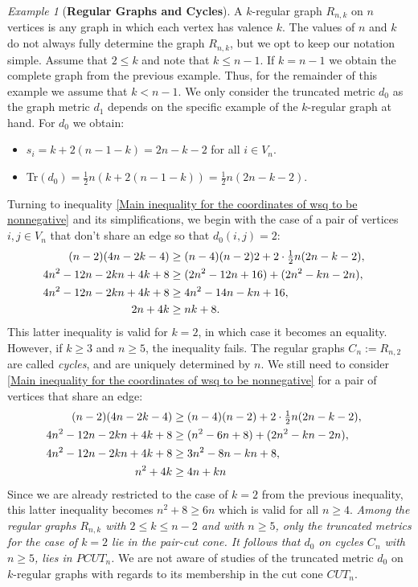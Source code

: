 \documentclass[12pt]{amsart}
\numberwithin{theorem}{section}
\theoremstyle{remark}
\newtheorem{example}[theorem]{Example}
\begin{document}
\begin{example}[{\bf Regular Graphs and Cycles}] \label{Example on regular graphs}
A $k$-regular graph $R_{n,k}$ on $n$ vertices is any graph in which each vertex has valence $k$. The values of $n$ and $k$ do not always fully determine the graph $R_{n,k}$, but we opt to keep our notation simple. Assume that $2\le k$ and note that $k\le n-1$. If $k=n-1$ we obtain the complete graph from the previous example. Thus, for the remainder of this example we assume that $k<n-1$. We only consider the truncated metric $d_0$ as the graph metric $d_1$ depends on the specific example of the $k$-regular graph at hand. For $d_0$ we obtain:
\begin{itemize}
\item[(i)] $s_i = k + 2(n-1-k) = 2n -k-2$ for all $i\in V_n$.  
\item[(ii)] Tr$(d_0) = \frac{1}{2}n(k+2(n-1-k)) = \frac{1}{2}n(2n -k -2)$.
\end{itemize} 
Turning to inequality \eqref{Main inequality for the coordinates of wsq to be nonnegative} and its simplifications, we begin with the case of a pair of vertices $i,j \in V_n$ that don't share an edge so that $d_0(i,j) = 2$:
\begin{align*}
(n-2)(4n-2k-4)  & \ge \textstyle (n-4)(n-2)2+  2\cdot \frac{1}{2}n(2n-k-2), \cr
4n^2-12n -2kn +4k+8 & \ge (2n^2-12n+16) + (2n^2-kn-2n), \cr     
4n^2-12n -2kn +4k+8 & \ge 4n^2-14n -kn +16,   \cr 
2n  +4k & \ge nk   +8.    
\end{align*}
This latter inequality is valid for $k=2$, in which case it becomes an equality. However, if $k\ge 3$ and $n\ge 5$, the inequality fails. The regular graphs $C_n:=R_{n,2}$ are called {\em cycles}, and are uniquely determined by $n$. We still need to consider \eqref{Main inequality for the coordinates of wsq to be nonnegative} for a pair of vertices that share an edge:
\begin{align*}
(n-2)(4n-2k-4)  & \ge \textstyle (n-4)(n-2)+  2\cdot \frac{1}{2}n(2n-k-2), \cr
4n^2-12n -2kn +4k+8 & \ge (n^2-6n+8) + (2n^2-kn-2n), \cr     
4n^2-12n -2kn +4k+8 & \ge 3n^2-8n -kn +8,   \cr 
n^2 +4k & \ge 4n+kn    
\end{align*}
Since we are already restricted to the case of $k=2$ from the previous inequality, this latter inequality becomes $n^2+8 \ge 6n$ which is valid for all $n\ge 4$.
\vskip2mm
 {\em Among the regular graphs $R_{n,k}$ with $2\le k \le n-2$ and with $n\ge 5$, only the truncated metrics for the case of $k=2$ lie in the pair-cut cone. It follows that $d_0$ on cycles $C_n$ with $n\ge 5$, lies in $PCUT_n$.} 
\vskip2mm
We are not aware of studies of the truncated metric $d_0$ on $k$-regular graphs with regards to its membership in the cut cone $CUT_n$. 
\end{example} 
\end{document}
